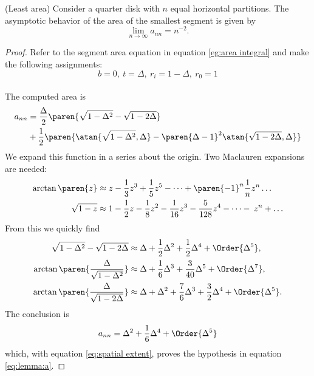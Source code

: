 \begin{myLemma}(Least area)
Consider a quarter disk with $n$ equal horizontal partitions. The asymptotic behavior of the area of the smallest segment is given by
%
\begin{equation}
  \lim_{n\to\infty} a_{nn} = n^{-2}.
\end{equation}
\end{myLemma}
%
\begin{proof}
Refer to the segment area equation in equation \eqref{eg:area integral} and make the following assignments:
$$b = 0, \ t = \Delta, \ r_{i} = 1 - \Delta, \ r_{0} = 1$$ \\
The computed area is
\begin{equation}
\begin{split}
  a_{nn} 
  & = \frac{\Delta}{2} \paren{\sqrt{1-\Delta^{2}} - \sqrt{1 - 2\Delta}  } \\
  & + \frac{1}{2} \paren{\atan{\sqrt{1-\Delta^{2}},\Delta} - \paren{\Delta-1}^{2}\atan{\sqrt{1-2\Delta},\Delta}}
  \label{eq:lemma:a}
\end{split}
%
\end{equation}
We expand this function in a series about the origin. Two Maclauren expansions are needed:
\begin{equation}
  \begin{split}
    \arctan\paren{z} 
      & \approx z - \frac{1}{3}z^{3} + \frac{1}{5}z^{5} - \dots + \paren{-1}^{n}\frac{1}{n}z^{n} \dots \\
    \sqrt{1-z} 
      & \approx 1 - \frac{1}{2}z - \frac{1}{8}z^{2} - \frac{1}{16}z^{3} - \frac{5}{128}z^{4} - \dots - \frac{}{} z^{n} + \dots
  \end{split}
\end{equation}
%
From this we quickly find
%
\begin{equation}
  \begin{split}
    \sqrt{1 - \Delta^{2}} - \sqrt{1 - 2\Delta}
      &\approx \Delta + \frac{1}{2} \Delta^{2} + \frac{1}{2} \Delta^{4} + \Order{\Delta^{5}}, \\
    \arctan{ \paren{\frac{\Delta} {\sqrt{1 - \Delta^{2}}}} }
      &\approx \Delta + \frac{1}{6} \Delta^{3} + \frac{3}{40} \Delta^{5} + \Order{\Delta^{7}}, \\
    \arctan{ \paren{\frac{\Delta} {\sqrt{1 - 2\Delta}}} }
      &\approx \Delta + \Delta^{2} + \frac{7}{6} \Delta^{3} + \frac{3}{2}\Delta^{4} + \Order{\Delta^{5}}.
  \end{split}
\end{equation}
%
The conclusion is
%
\begin{equation}
  a_{nn} = \Delta^{2} + \frac{1}{6} \Delta^{4} + \Order{\Delta^{5}}
\end{equation}
%
which, with equation \eqref{eq:spatial extent}, proves the hypothesis in equation \eqref{eq:lemma:a}.
\end{proof}


\endinput %